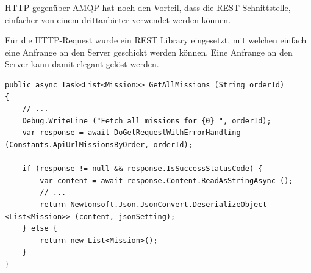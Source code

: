 HTTP gegenüber AMQP hat noch den Vorteil, dass die REST Schnittstelle, einfacher von einem drittanbieter verwendet werden können.

Für die HTTP-Request wurde ein REST Library eingesetzt, mit welchen einfach eine Anfrange an den Server geschickt werden können.
Eine Anfrange an den Server kann damit elegant gelöst werden.

\begin{lstlisting}
public async Task<List<Mission>> GetAllMissions (String orderId)
{
    // ...
    Debug.WriteLine ("Fetch all missions for {0} ", orderId);
    var response = await DoGetRequestWithErrorHandling (Constants.ApiUrlMissionsByOrder, orderId);

    if (response != null && response.IsSuccessStatusCode) {
        var content = await response.Content.ReadAsStringAsync ();
        // ...
        return Newtonsoft.Json.JsonConvert.DeserializeObject <List<Mission>> (content, jsonSetting);
    } else {
        return new List<Mission>();
    }
}
\end{lstlisting}


